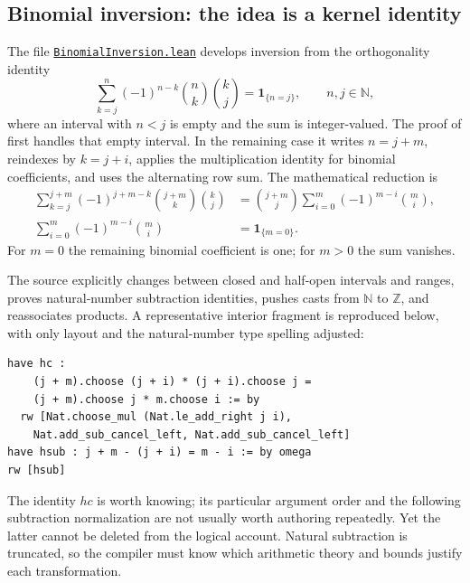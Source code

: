 \documentclass[11pt,a4paper]{article}
\newcommand{\code}[1]{\texttt{\detokenize{#1}}}
\newcommand{\N}{\mathbb N}
\newcommand{\Z}{\mathbb Z}
\newcommand{\ind}[1]{\mathbf 1_{\{#1\}}}
\newcommand{\pfile}[1]{\href{https://github.com/VladimirReshetnikov/ProveIt/blob/24ce8bd743eaab64a91ce90725ea00f498d319d2/Analysis/FabiusFunction/Lean/FabiusFunction/#1}{\nolinkurl{#1}}}
\theoremstyle{remark}
\begin{document}
\subsection{Binomial inversion: the idea is a kernel identity}
\label{sec:binom-source}
The file \pfile{BinomialInversion.lean} develops inversion from the orthogonality identity
\begin{equation}
\sum_{k=j}^{n}(-1)^{n-k}\binom nk\binom kj=\ind{n=j},
\qquad n,j\in\N,
\label{eq:orthogonality}
\end{equation}
where an interval with $n<j$ is empty and the sum is integer-valued. The proof of
\code{sum_Icc_neg_one_pow_choose_mul_choose}
first handles that empty interval. In the remaining case it writes $n=j+m$, reindexes by $k=j+i$, applies the multiplication identity for binomial coefficients, and uses the alternating row sum. The mathematical reduction is
\begin{align}
\sum_{k=j}^{j+m}(-1)^{j+m-k}\binom{j+m}{k}\binom kj
&=\binom{j+m}{j}\sum_{i=0}^{m}(-1)^{m-i}\binom mi,\label{eq:binom-reduction}\\
\sum_{i=0}^{m}(-1)^{m-i}\binom mi&=\ind{m=0}.\label{eq:alternating}
\end{align}
For $m=0$ the remaining binomial coefficient is one; for $m>0$ the sum vanishes.

The source explicitly changes between closed and half-open intervals and ranges, proves natural-number subtraction identities, pushes casts from $\N$ to $\Z$, and reassociates products. A representative interior fragment is reproduced below, with only layout and the natural-number type spelling adjusted:
\par\noindent\begin{minipage}{\linewidth}
\begin{lstlisting}[caption={A representation bridge inside the existing binomial proof.}]
have hc :
    (j + m).choose (j + i) * (j + i).choose j =
    (j + m).choose j * m.choose i := by
  rw [Nat.choose_mul (Nat.le_add_right j i),
    Nat.add_sub_cancel_left, Nat.add_sub_cancel_left]
have hsub : j + m - (j + i) = m - i := by omega
rw [hsub]
\end{lstlisting}
\end{minipage}\par
The identity $hc$ is worth knowing; its particular argument order and the following subtraction normalization are not usually worth authoring repeatedly. Yet the latter cannot be deleted from the logical account. Natural subtraction is truncated, so the compiler must know which arithmetic theory and bounds justify each transformation.
\end{document}
